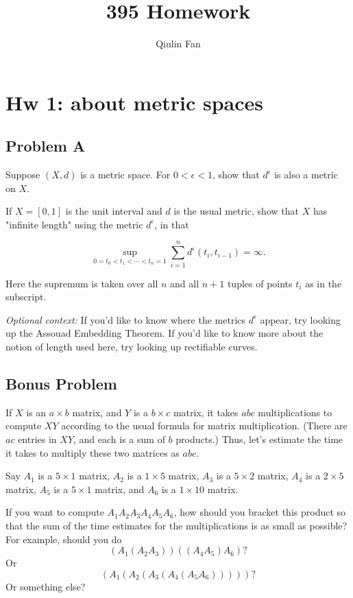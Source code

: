 \documentclass[lang=cn,11pt]{template}
\title{395 Homework}
\author{Qiulin Fan}
\begin{document}
   
\frontmatter
\tableofcontents
\mainmatter



\chapter*{Hw 1: about metric spaces}

\section*{Problem A}
Suppose \((X, d)\) is a metric space. For \(0 < \epsilon < 1\), show that \(d^\epsilon\) is also a metric on \(X\).

If \(X = [0, 1]\) is the unit interval and \(d\) is the usual metric, show that \(X\) has "infinite length" using the metric \(d^\epsilon\), in that

\[
\sup_{0 = t_0 < t_1 < \cdots < t_n = 1} \sum_{i=1}^{n} d^\epsilon(t_i, t_{i-1}) = \infty.
\]

Here the supremum is taken over all \(n\) and all \(n + 1\) tuples of points \(t_i\) as in the subscript.

\textit{Optional context:} If you’d like to know where the metrics \(d^\epsilon\) appear, try looking up the Assouad Embedding Theorem. If you’d like to know more about the notion of length used here, try looking up rectifiable curves.

\section*{Bonus Problem}
If \(X\) is an \(a \times b\) matrix, and \(Y\) is a \(b \times c\) matrix, it takes \(abc\) multiplications to compute \(XY\) according to the usual formula for matrix multiplication. (There are \(ac\) entries in \(XY\), and each is a sum of \(b\) products.) Thus, let’s estimate the time it takes to multiply these two matrices as \(abc\).

Say \(A_1\) is a \(5 \times 1\) matrix, \(A_2\) is a \(1 \times 5\) matrix, \(A_3\) is a \(5 \times 2\) matrix, \(A_4\) is a \(2 \times 5\) matrix, \(A_5\) is a \(5 \times 1\) matrix, and \(A_6\) is a \(1 \times 10\) matrix.

If you want to compute \(A_1 A_2 A_3 A_4 A_5 A_6\), how should you bracket this product so that the sum of the time estimates for the multiplications is as small as possible? For example, should you do
\[
(A_1 (A_2 A_3)) ((A_4 A_5) A_6)?
\]
Or
\[
(A_1 (A_2 (A_3 (A_4 (A_5 A_6)))))?
\]
Or something else?
\end{document}
